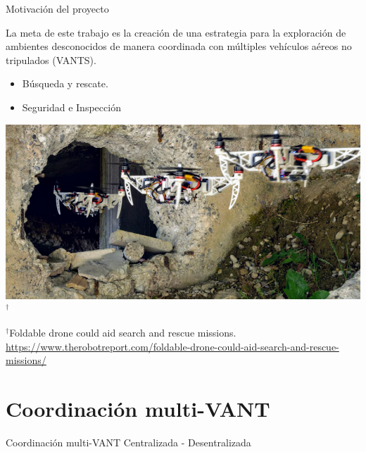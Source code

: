 \documentclass[
  24pt, %
  aspectratio=169, %
]{beamer}
\begin{document}
\begin{frame}{Motivación del proyecto}
  \begin{minipage}{0.47\textwidth}

    \small La meta de este trabajo es la creación de una estrategia para la exploración de ambientes desconocidos de manera coordinada con múltiples vehículos aéreos no tripulados (VANTS).
    \bigskip %
    \begin{itemize}
    \item Búsqueda y rescate.
    \item Seguridad e Inspección
    \end{itemize}
  \end{minipage}
  \hspace{0.2cm}
  \begin{minipage}{0.5\textwidth}
    \includegraphics[width=\textwidth]{foldable-drone}$^\dag$\\
      \rule{0in}{1.2em}$^\dag$\scriptsize Foldable drone could aid search and rescue missions.\\
      \tiny \url{https://www.therobotreport.com/foldable-drone-could-aid-search-and-rescue-missions/} 
  \end{minipage}
\end{frame}

\section{Coordinación multi-VANT}
\begin{frame}{Coordinación multi-VANT}
Centralizada - Desentralizada
\end{frame}

\end{document}
